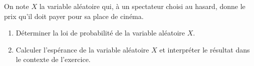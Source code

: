 \begin{enumerate}
	On note $X$ la variable aléatoire qui, à un spectateur choisi au hasard, donne le prix qu'il doit payer pour sa place de cinéma.

	\begin{enumerate}
		\item Déterminer la loi de probabilité de la variable aléatoire $X$.
		\item Calculer l'espérance de la variable aléatoire $X$ et interpréter le résultat dans le contexte de l'exercice.
	\end{enumerate}
\end{enumerate}
